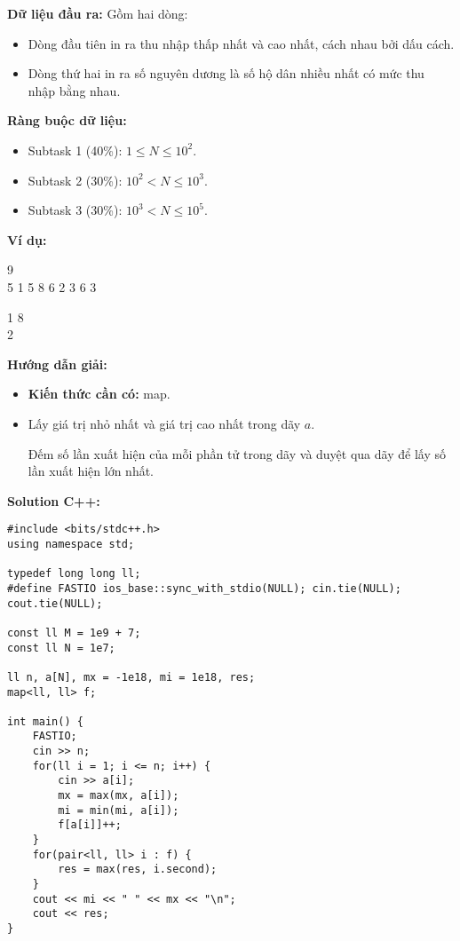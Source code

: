 \documentclass[12pt]{scrartcl}  %
\begin{document}
\textbf{Dữ liệu đầu ra:}
Gồm hai dòng:

\begin{itemize}
    \item Dòng đầu tiên in ra thu nhập thấp nhất và cao nhất, cách nhau bởi dấu cách.
    \item Dòng thứ hai in ra số nguyên dương là số hộ dân nhiều nhất có mức thu nhập bằng nhau.
\end{itemize}

\textbf{Ràng buộc dữ liệu:}
\begin{itemize}
    \item Subtask 1 (40\%): $1 \leq N \leq 10^2$.
    \item Subtask 2 (30\%): $10^2 < N \leq 10^3$.
    \item Subtask 3 (30\%): $10^3 < N \leq 10^5$.
\end{itemize}

\textbf{Ví dụ:}
\begin{tcolorbox}[colback=gray!5!white, colframe=blue!50!black, title=Input]
9\\
5 1 5 8 6 2 3 6 3
\end{tcolorbox}
\begin{tcolorbox}[colback=gray!5!white, colframe=green!50!black, title=Output]
1 8\\
2
\end{tcolorbox}
\textbf{Hướng dẫn giải:}
\begin{itemize}
    \item \textbf{Kiến thức cần có:} map.
    \item Lấy giá trị nhỏ nhất và giá trị cao nhất trong dãy $a$.
    
    Đếm số lần xuất hiện của mỗi phần tử trong dãy và duyệt qua dãy để lấy số lần xuất hiện lớn nhất.
\end{itemize}


\textbf{Solution C++:}
\begin{lstlisting}
#include <bits/stdc++.h>
using namespace std;

typedef long long ll;
#define FASTIO ios_base::sync_with_stdio(NULL); cin.tie(NULL); cout.tie(NULL);

const ll M = 1e9 + 7;
const ll N = 1e7;

ll n, a[N], mx = -1e18, mi = 1e18, res;
map<ll, ll> f;

int main() {
    FASTIO;
    cin >> n;
    for(ll i = 1; i <= n; i++) {
        cin >> a[i];
        mx = max(mx, a[i]);
        mi = min(mi, a[i]);
        f[a[i]]++;
    }
    for(pair<ll, ll> i : f) {
        res = max(res, i.second);
    }
    cout << mi << " " << mx << "\n";
    cout << res;
}

\end{lstlisting}
\end{document}
